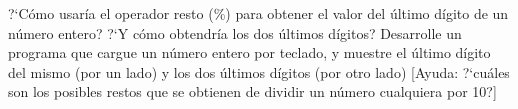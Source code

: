 ?`Cómo usaría el operador resto (\%) para obtener el valor del último dígito de un número entero? ?`Y cómo obtendría los dos últimos dígitos? Desarrolle un programa que cargue un número entero por teclado, y muestre el último dígito del mismo (por un lado) y los dos últimos dígitos (por otro lado) [Ayuda: ?`cuáles son los posibles restos que se obtienen de dividir un número cualquiera por 10?] 

